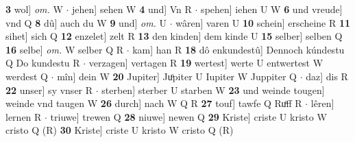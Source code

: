 \documentclass[8pt,a4paper,notitlepage]{article}
\begin{document}
\begin{table}[ht]
\begin{minipage}[t]{0.5\linewidth}
\textbf{3} wol] \textit{om.} W  $\cdot$ jehen] sehen W \textbf{4} und] Vn R  $\cdot$ spehen] iehen U W \textbf{6} und vreude] vnd Q \textbf{8} dû] auch du W \textbf{9} und] \textit{om.} U  $\cdot$ wâren] varen U \textbf{10} schein] erscheine R \textbf{11} sihet] sich Q \textbf{12} enzelet] zelt R \textbf{13} den kinden] dem kinde U \textbf{15} selber] selben Q \textbf{16} selbe] \textit{om.} W selber Q R  $\cdot$ kam] han R \textbf{18} dô enkundestû] Dennoch kúndestu Q Do kundestu R  $\cdot$ verzagen] vertagen R \textbf{19} wertest] werte U entwertest W werdest Q  $\cdot$ mîn] dein W \textbf{20} Jupiter] Juͦpiter U Iupiter W Juppiter Q  $\cdot$ daz] dis R \textbf{22} unser] sy vnser R  $\cdot$ sterben] sterber U starben W \textbf{23} und weinde tougen] weinde vnd taugen W \textbf{26} durch] nach W Q R \textbf{27} touf] tawfe Q Ruͦff R  $\cdot$ lêren] lernen R  $\cdot$ triuwe] trewen Q \textbf{28} niuwe] newen Q \textbf{29} Kriste] criste U kristo W cristo Q (R) \textbf{30} Kriste] criste U kristo W cristo Q (R) \newline
\end{minipage}
\end{table}
\end{document}
